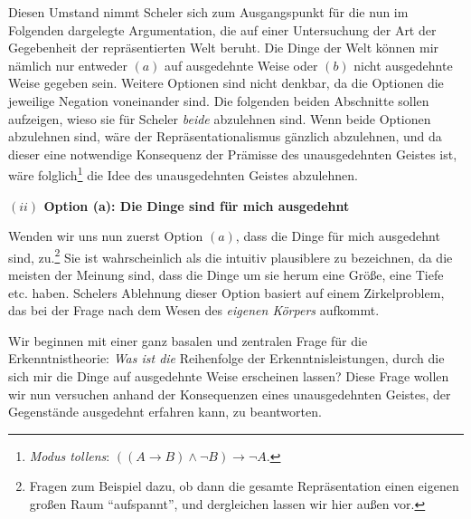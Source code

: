 \documentclass[a4paper, 12pt]{article}
\begin{document}
\begin{onehalfspace}

Diesen Umstand nimmt Scheler sich zum Ausgangspunkt für die nun im Folgenden dargelegte Argumentation, die auf einer Untersuchung der Art der Gegebenheit der repräsentierten Welt beruht. Die Dinge der Welt können mir nämlich nur entweder $(a)$ auf ausgedehnte Weise oder $(b)$ nicht ausgedehnte Weise gegeben sein. Weitere Optionen sind nicht denkbar, da die Optionen die jeweilige Negation voneinander sind. Die folgenden beiden Abschnitte sollen aufzeigen, wieso sie für Scheler \emph{beide} abzulehnen sind. Wenn beide Optionen abzulehnen sind, wäre der Repräsentationalismus gänzlich abzulehnen, und da dieser eine notwendige Konsequenz der Prämisse des unausgedehnten Geistes ist, wäre folglich\footnote{\emph{Modus tollens}: $((A \rightarrow B) \land \neg B)  \rightarrow \neg A$.} die Idee des unausgedehnten Geistes abzulehnen.

\vspace{5mm}
\noindent\textbf{$(ii)$ Option (a): Die Dinge sind für mich ausgedehnt}


\noindent Wenden wir uns nun zuerst Option $(a)$, dass die Dinge für mich ausgedehnt sind, zu.\footnote{Fragen zum Beispiel dazu, ob dann die gesamte Repräsentation einen eigenen großen Raum "`aufspannt"', und dergleichen lassen wir hier außen vor.} Sie ist wahrscheinlich als die intuitiv plausiblere zu bezeichnen, da die meisten der Meinung sind, dass die Dinge um sie herum eine Größe, eine Tiefe etc. haben. Schelers Ablehnung dieser Option basiert auf einem Zirkelproblem, das bei der Frage nach dem Wesen des \emph{eigenen Körpers} aufkommt.


Wir beginnen mit einer ganz basalen und zentralen Frage für die Erkenntnistheorie: \emph{Was ist die} Reihenfolge der Erkenntnisleistungen, durch die sich mir die Dinge auf ausgedehnte Weise erscheinen lassen? Diese Frage wollen wir nun versuchen anhand der Konsequenzen eines unausgedehnten Geistes, der Gegenstände ausgedehnt erfahren kann, zu beantworten. 


\end{onehalfspace}
\end{document}

